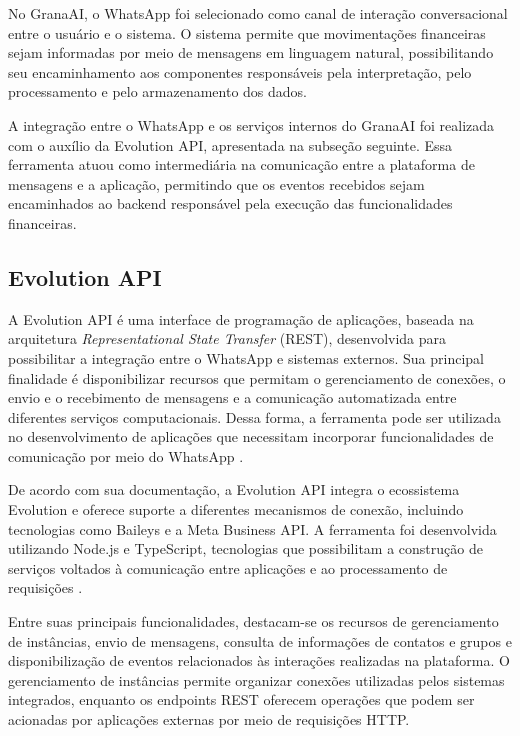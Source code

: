 No GranaAI, o WhatsApp foi selecionado como canal de interação conversacional entre o usuário e o sistema. O sistema permite que movimentações financeiras sejam informadas por meio de mensagens em linguagem natural, possibilitando seu encaminhamento aos componentes responsáveis pela interpretação, pelo processamento e pelo armazenamento dos dados.

A integração entre o WhatsApp e os serviços internos do GranaAI foi realizada com o auxílio da Evolution API, apresentada na subseção seguinte. Essa ferramenta atuou como intermediária na comunicação entre a plataforma de mensagens e a aplicação, permitindo que os eventos recebidos sejam encaminhados ao backend responsável pela execução das funcionalidades financeiras.


\subsection{Evolution API}

A Evolution API é uma interface de programação de aplicações, baseada na arquitetura \textit{Representational State Transfer} (REST), desenvolvida para possibilitar a integração entre o WhatsApp e sistemas externos. Sua principal finalidade é disponibilizar recursos que permitam o gerenciamento de conexões, o envio e o recebimento de mensagens e a comunicação automatizada entre diferentes serviços computacionais. Dessa forma, a ferramenta pode ser utilizada no desenvolvimento de aplicações que necessitam incorporar funcionalidades de comunicação por meio do WhatsApp \cite{evolution_api_docs_2026}.

De acordo com sua documentação, a Evolution API integra o ecossistema Evolution e oferece suporte a diferentes mecanismos de conexão, incluindo tecnologias como Baileys e a Meta Business API. A ferramenta foi desenvolvida utilizando Node.js e TypeScript, tecnologias que possibilitam a construção de serviços voltados à comunicação entre aplicações e ao processamento de requisições \cite{evolution_api_docs_2026}.

Entre suas principais funcionalidades, destacam-se os recursos de gerenciamento de instâncias, envio de mensagens, consulta de informações de contatos e grupos e disponibilização de eventos relacionados às interações realizadas na plataforma. O gerenciamento de instâncias permite organizar conexões utilizadas pelos sistemas integrados, enquanto os endpoints REST oferecem operações que podem ser acionadas por aplicações externas por meio de requisições HTTP.

